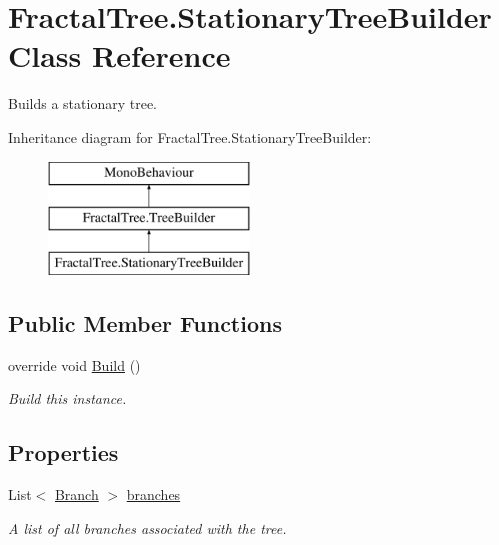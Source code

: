 \hypertarget{class_fractal_tree_1_1_stationary_tree_builder}{}\section{Fractal\+Tree.\+Stationary\+Tree\+Builder Class Reference}
\label{class_fractal_tree_1_1_stationary_tree_builder}


Builds a stationary tree.  


Inheritance diagram for Fractal\+Tree.\+Stationary\+Tree\+Builder\+:\begin{figure}[H]
\begin{center}
\leavevmode
\includegraphics[height=3.000000cm]{class_fractal_tree_1_1_stationary_tree_builder}
\end{center}
\end{figure}
\subsection*{Public Member Functions}
\begin{DoxyCompactItemize}
\item 
override void \hyperlink{class_fractal_tree_1_1_stationary_tree_builder_ab11cfafdc3a0e6c29fe4eef3318331b7}{Build} ()
\begin{DoxyCompactList}\small\item\em Build this instance. \end{DoxyCompactList}\end{DoxyCompactItemize}
\subsection*{Properties}
\begin{DoxyCompactItemize}
\item 
List$<$ \hyperlink{interface_fractal_tree_1_1_branch}{Branch} $>$ \hyperlink{class_fractal_tree_1_1_stationary_tree_builder_a103e903dbfba82226ab6cbb08fff382a}{branches}
\begin{DoxyCompactList}\small\item\em A list of all branches associated with the tree. \end{DoxyCompactList}\end{DoxyCompactItemize}
